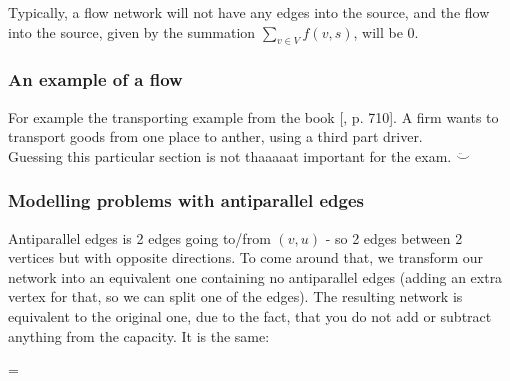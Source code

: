 Typically, a flow network will not have any edges into the source, and the flow into the source, given by the summation $\sum_{v \in V} f(v, s)$, will be 0.
\subsubsection{An example of a flow}
For example the transporting example from the book [\cite{CLRS}, p. 710]. A firm wants to transport goods from one place to anther, using a third part driver. \\

Guessing this particular section is not thaaaaat important for the exam. $\ddot\smile$

\subsubsection{Modelling problems with antiparallel edges}
Antiparallel edges is 2 edges going to/from $(v, u)$ - so 2 edges between 2 vertices but with opposite directions. To come around that, we transform our network into an equivalent one containing no antiparallel edges (adding an extra vertex for that, so we can split one of the edges). The resulting network is equivalent to the original one, due to the fact, that you do not add or subtract anything from the capacity. It is the same:\\

\begin{minipage}{.5\textwidth}
\centering
{} 
\end{minipage}%
=
\begin{minipage}{.5\textwidth}
\centering
{} 
\end{minipage}

